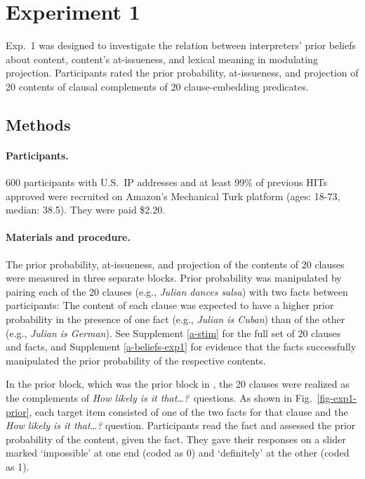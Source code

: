 \documentclass[11pt,fleqn]{article}
\newcommand{\6}{\mbox{$[\hspace*{-.6mm}[$}}
\newcommand{\9}{\mbox{$]\hspace*{-.6mm}]$}}
\begin{document}
\section{Experiment 1}\label{s2}

Exp.~1 was designed to investigate the relation between interpreters' prior beliefs about content, content's at-issueness, and lexical meaning in modulating projection. Participants rated the prior probability, at-issueness, and projection of 20 contents of clausal complements of 20 clause-embedding predicates. 

\subsection{Methods} 
 
\paragraph{Participants.} 600 participants with U.S.\ IP addresses and at least 99\% of previous HITs approved were recruited on Amazon's Mechanical Turk platform (ages: 18-73, median: 38.5). They were paid \$2.20.

\paragraph{Materials and procedure.} The prior probability, at-issueness, and projection of the contents of 20 clauses were measured in three separate blocks. Prior probability was manipulated by pairing each of the 20 clauses (e.g., \emph{Julian dances salsa})  with two facts between participants: The content of each clause was expected to have a higher prior probability in the presence of one fact (e.g., \emph{Julian is Cuban}) than of the other (e.g., \emph{Julian is German}). See Supplement \ref{a-stim} for the full set of 20 clauses and facts, and Supplement \ref{a-beliefs-exp1} for evidence that the facts successfully manipulated the prior probability of the respective contents.

In the prior block, which was the prior block in \citealt{degen-tonhauser-openmind}, the 20 clauses were realized as the complements of {\em How likely is it that\ldots?}~questions. As shown in Fig.~\ref{fig-exp1-prior}, each target item consisted of one of the two facts for that clause and the {\em How likely is it that\ldots?} question. Participants read the fact and assessed the prior probability of the content, given the fact. They gave their responses on a slider marked `impossible' at one end (coded as 0) and `definitely' at the other (coded as 1). 
\end{document}
